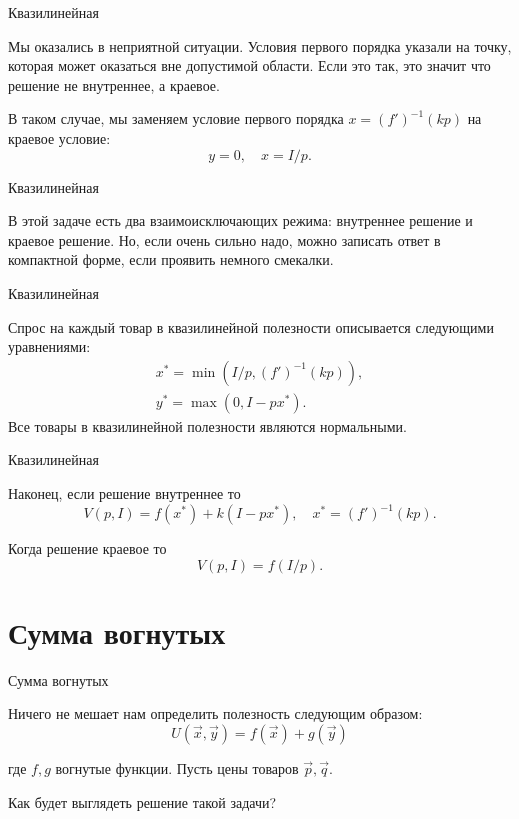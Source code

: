 \documentclass{beamer}
\begin{document}
\begin{frame}{Квазилинейная}

Мы оказались в неприятной ситуации. Условия первого порядка указали на точку, которая может оказаться вне допустимой области. Если это так, это значит что решение не внутреннее, а краевое. 

В таком случае, мы заменяем условие первого порядка  $x = (f')^{-1}(kp)$ на краевое условие: 
$$y=0, \quad x = I/p.$$

\end{frame}

\begin{frame}{Квазилинейная}

В этой задаче есть два взаимоисключающих режима: внутреннее решение и краевое решение. Но, если очень сильно надо, можно записать ответ в компактной форме, если проявить немного смекалки.

\end{frame}

\begin{frame}{Квазилинейная}

Спрос на каждый товар в квазилинейной полезности описывается следующими уравнениями:
\begin{gather*}
x^{\ast} = \min (I/p, (f')^{-1}(k p)), \\
y^{\ast} = \max (0, I-px^{\ast}).
\end{gather*}
Все товары в квазилинейной полезности являются нормальными.
\end{frame}

\begin{frame}{Квазилинейная}

Наконец, если решение внутреннее то
$$V(p,I) = f(x^{\ast}) + k(I - p x^{\ast}), \quad x^{\ast} = (f')^{-1}(k p).$$

Когда решение краевое то
$$V(p,I) = f(I/p).$$

\end{frame}

\section{Сумма вогнутых}

\begin{frame}{Сумма вогнутых}

Ничего не мешает нам определить полезность следующим образом:
$$ U(\vec x, \vec y) = f(\vec x) + g(\vec y)$$

где $f,g$ вогнутые функции. Пусть цены товаров $\vec p, \vec q$.

Как будет выглядеть решение такой задачи?

\end{frame}
\end{document}
